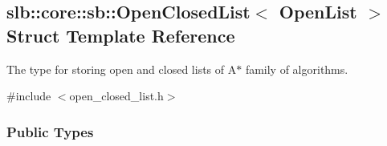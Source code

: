 \hypertarget{structslb_1_1core_1_1sb_1_1OpenClosedList}{}\subsection{slb\+:\+:core\+:\+:sb\+:\+:Open\+Closed\+List$<$ Open\+List $>$ Struct Template Reference}
\label{structslb_1_1core_1_1sb_1_1OpenClosedList}


The type for storing open and closed lists of {\ttfamily A$\ast$} family of algorithms.  




{\ttfamily \#include $<$open\+\_\+closed\+\_\+list.\+h$>$}

\subsubsection*{Public Types}
